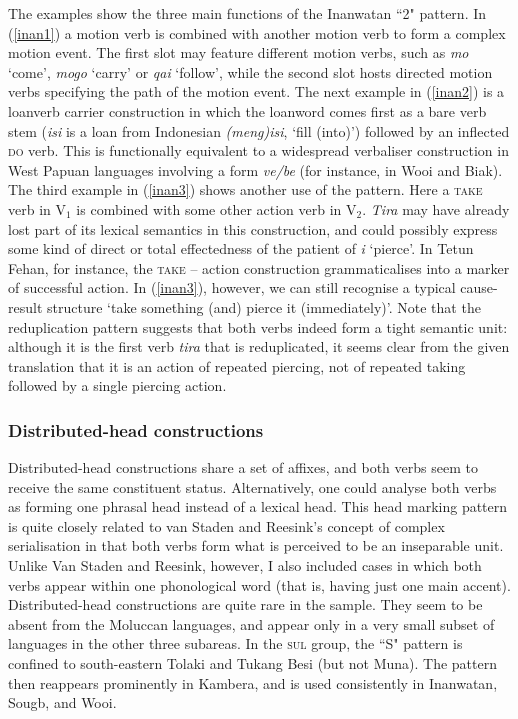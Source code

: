 The examples show the three main functions of the Inanwatan ``2" pattern. In (\ref{inan1}) a motion verb is combined with another motion verb to form a complex motion event. The first slot may feature different motion verbs, such as \textit{mo} `come', \textit{mogo} `carry' or \textit{qai} `follow', while the second slot hosts directed motion verbs specifying the path of the motion event. The next example in (\ref{inan2}) is a loanverb carrier construction in which the loanword comes first as a bare verb stem (\textit{isi} is a loan from Indonesian \textit{(meng)isi}, `fill (into)') followed by an inflected \textsc{do} verb. This is functionally equivalent to a widespread verbaliser construction in West Papuan languages involving a form \textit{ve/be} (for instance, in Wooi and Biak). The third example in (\ref{inan3}) shows another use of the pattern. Here a \textsc{take} verb in V$_1$ is combined with some other action verb in V$_2$. \textit{Tira} may have already lost part of its lexical semantics in this construction, and could possibly express some kind of direct or total effectedness of the patient of \textit{i} `pierce'. In Tetun Fehan, for instance, the \textsc{take} -- action construction grammaticalises into a marker of successful action. In (\ref{inan3}), however, we can still recognise a typical cause-result structure `take something (and) pierce it (immediately)'. Note that the reduplication pattern suggests that both verbs indeed form a tight semantic unit: although it is the first verb \textit{tira} that is reduplicated, it seems clear from the given translation that it is an action of repeated piercing, not of repeated taking followed by a single piercing action.

\subsubsection{Distributed-head constructions}

Distributed-head constructions share a set of affixes, and both verbs seem to receive the same constituent status. Alternatively, one could analyse both verbs as forming one phrasal head instead of a lexical head. This head marking pattern is quite closely related to van Staden and Reesink's concept of complex serialisation in that both verbs form what is perceived to be an inseparable unit. Unlike Van Staden and Reesink, however, I also included cases in which both verbs appear within one phonological word (that is, having just one main accent). Distributed-head constructions are quite rare in the sample. They seem to be absent from the Moluccan languages, and appear only in a very small subset of languages in the other three subareas. In the \textsc{sul} group, the ``S" pattern is confined to south-eastern Tolaki and Tukang Besi (but not Muna). The pattern then reappears prominently in Kambera, and is used consistently in Inanwatan, Sougb, and Wooi.

